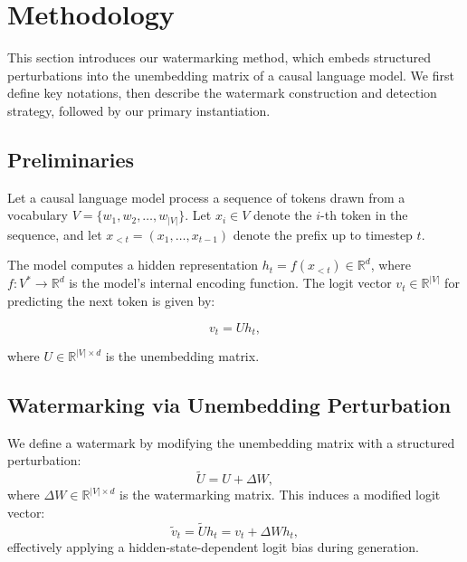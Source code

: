 \section{Methodology}

This section introduces our watermarking method, which embeds structured perturbations into the unembedding matrix of a causal language model. We first define key notations, then describe the watermark construction and detection strategy, followed by our primary instantiation.

\subsection{Preliminaries}

Let a causal language model process a sequence of tokens drawn from a vocabulary \( V = \{w_1, w_2, \dots, w_{|V|}\} \). Let \( x_i \in V \) denote the \( i \)-th token in the sequence, and let \( x_{<t} = (x_1, \dots, x_{t-1}) \) denote the prefix up to timestep \( t \).

The model computes a hidden representation \( h_t = f(x_{<t}) \in \mathbb{R}^d \), where \( f: V^* \rightarrow \mathbb{R}^d \) is the model’s internal encoding function. The logit vector \( v_t \in \mathbb{R}^{|V|} \) for predicting the next token is given by:

\begin{equation}
    v_t = U h_t,
\end{equation}

where \( U \in \mathbb{R}^{|V| \times d} \) is the unembedding matrix.

\subsection{Watermarking via Unembedding Perturbation}

We define a watermark by modifying the unembedding matrix with a structured perturbation:
\begin{equation}
    \tilde{U} = U + \Delta W,
\end{equation}
where \( \Delta W \in \mathbb{R}^{|V| \times d} \) is the watermarking matrix. This induces a modified logit vector:
\begin{equation}
    \tilde{v}_t = \tilde{U} h_t = v_t + \Delta W h_t,
\end{equation}
effectively applying a hidden-state-dependent logit bias during generation.


